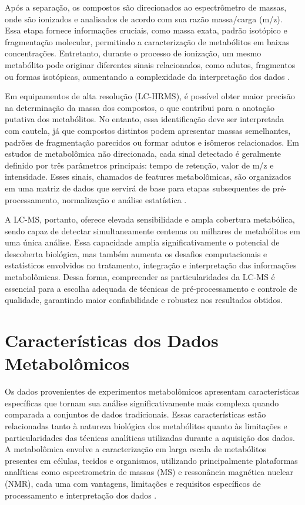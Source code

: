 Após a separação, os compostos são direcionados ao espectrômetro de massas, onde são ionizados e analisados de acordo com sua razão massa/carga (m/z). Essa etapa fornece informações cruciais, como massa exata, padrão isotópico e fragmentação molecular, permitindo a caracterização de metabólitos em baixas concentrações. Entretanto, durante o processo de ionização, um mesmo metabólito pode originar diferentes sinais relacionados, como adutos, fragmentos ou formas isotópicas, aumentando a complexidade da interpretação dos dados \cite{shahjaman2021rmisbeta}.

Em equipamentos de alta resolução (LC-HRMS), é possível obter maior precisão na determinação da massa dos compostos, o que contribui para a anotação putativa dos metabólitos. No entanto, essa identificação deve ser interpretada com cautela, já que compostos distintos podem apresentar massas semelhantes, padrões de fragmentação parecidos ou formar adutos e isômeros relacionados. Em estudos de metabolômica não direcionada, cada sinal detectado é geralmente definido por três parâmetros principais: tempo de retenção, valor de m/z e intensidade. Esses sinais, chamados de features metabolômicas, são organizados em uma matriz de dados que servirá de base para etapas subsequentes de pré-processamento, normalização e análise estatística \cite{NMR}.

A LC-MS, portanto, oferece elevada sensibilidade e ampla cobertura metabólica, sendo capaz de detectar simultaneamente centenas ou milhares de metabólitos em uma única análise. Essa capacidade amplia significativamente o potencial de descoberta biológica, mas também aumenta os desafios computacionais e estatísticos envolvidos no tratamento, integração e interpretação das informações metabolômicas. Dessa forma, compreender as particularidades da LC-MS é essencial para a escolha adequada de técnicas de pré-processamento e controle de qualidade, garantindo maior confiabilidade e robustez nos resultados obtidos.


\section{\textbf{Características dos Dados Metabolômicos}}

Os dados provenientes de experimentos metabolômicos apresentam características específicas que tornam sua análise significativamente mais complexa quando comparada a conjuntos de dados tradicionais. Essas características estão relacionadas tanto à natureza biológica dos metabólitos quanto às limitações e particularidades das técnicas analíticas utilizadas durante a aquisição dos dados. A metabolômica envolve a caracterização em larga escala de metabólitos presentes em células, tecidos e organismos, utilizando principalmente plataformas analíticas como espectrometria de massas (MS) e ressonância magnética nuclear (NMR), cada uma com vantagens, limitações e requisitos específicos de processamento e interpretação dos dados \cite{chen2022guide}.

